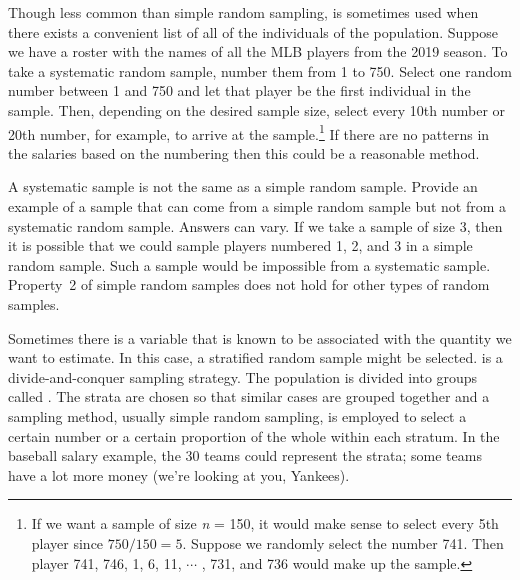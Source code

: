 Though less common than simple random sampling,  is sometimes used when there exists a convenient list of all of the individuals of the population. Suppose we have a roster with the names of all the MLB players from the 2019 season. To take a systematic random sample, number them from 1 to 750. Select one random number between 1 and 750 and let that player be the first individual in the sample. Then, depending on the desired sample size, select every 10th number or 20th number, for example, to arrive at the sample.\footnote{If we want a sample of size \textit{n} = 150, it would make sense to select every 5th player since \mbox{$750/150 = 5$.} Suppose we randomly select the number 741. Then player 741, 746, 1, 6, 11, $\cdots$ , 731, and 736 would make up the sample.} If there are no patterns in the salaries based on the numbering then this could be a reasonable method.

\begin{examplewrap}
\begin{nexample}{A systematic sample is not the same as a simple random sample. Provide an example of a sample that can come from a simple random sample but not from a systematic random sample.}
Answers can vary. If we take a sample of size 3, then it is possible that we could sample players numbered 1, 2, and 3 in a simple random sample. Such a sample would be impossible from a systematic sample. Property~2 of simple random samples does not hold for other types of random samples.
\end{nexample}
\end{examplewrap}

\D{\newpage}

Sometimes there is a variable that is known to be associated with the quantity we want to estimate. In this case, a stratified random sample might be selected.  is a divide-and-conquer sampling strategy. The population is divided into groups called . The strata are chosen so that similar cases are grouped together and a sampling method, usually simple random sampling, is employed to select a certain number or a certain proportion of the whole within each stratum. In the baseball salary example, the 30 teams could represent the strata; some teams have a lot more money (we're looking at you, Yankees).

